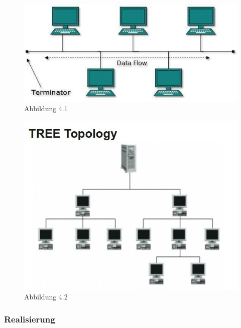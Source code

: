 \begin{figure}[h!]
	\includegraphics[width=\linewidth]{bus_topology.jpg}
	\caption{Abbildung 4.1}
\end{figure}
\begin{figure}[h!]
	\includegraphics[width=\linewidth]{tree_topology.jpg}
	\caption{Abbildung 4.2}
\end{figure}

\subsubsection{Realisierung}
